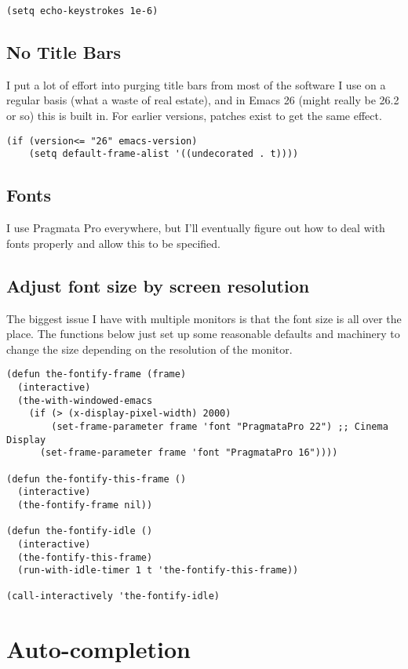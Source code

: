 \documentclass[11pt]{article}
\begin{document}
\begin{verbatim}
(setq echo-keystrokes 1e-6)
\end{verbatim}

\subsection{No Title Bars}
\label{sec:orgbcd6a96}
I put a lot of effort into purging title bars from most of the
software I use on a regular basis (what a waste of real estate), and
in Emacs 26 (might really be 26.2 or so) this is built in. For earlier
versions, patches exist to get the same effect.

\begin{verbatim}
(if (version<= "26" emacs-version)
    (setq default-frame-alist '((undecorated . t))))
\end{verbatim}

\subsection{Fonts}
\label{sec:orgb1aeb44}
I use Pragmata Pro everywhere, but I'll eventually figure out how to
deal with fonts properly and allow this to be specified.

\subsection{Adjust font size by screen resolution}
\label{sec:org14309ac}
The biggest issue I have with multiple monitors is that the font size
is all over the place. The functions below just set up some reasonable
defaults and machinery to change the size depending on the resolution
of the monitor.

\begin{verbatim}
(defun the-fontify-frame (frame)
  (interactive)
  (the-with-windowed-emacs
    (if (> (x-display-pixel-width) 2000)
        (set-frame-parameter frame 'font "PragmataPro 22") ;; Cinema Display
      (set-frame-parameter frame 'font "PragmataPro 16"))))

(defun the-fontify-this-frame ()
  (interactive)
  (the-fontify-frame nil))

(defun the-fontify-idle ()
  (interactive)
  (the-fontify-this-frame)
  (run-with-idle-timer 1 t 'the-fontify-this-frame))

(call-interactively 'the-fontify-idle)
\end{verbatim}
\section{Auto-completion}
\label{sec:org2efb629}
\end{document}
